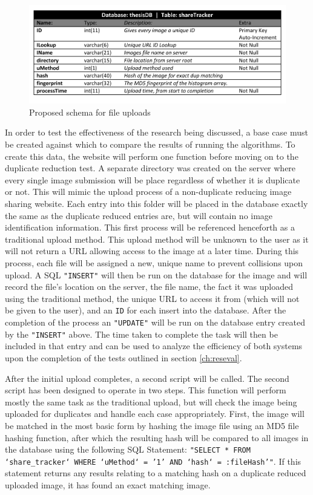\begin{figure}[htbp]
\centering
\includegraphics[width=6in]{schema}
\caption{Proposed schema for file uploads}
\label{fig:schema}
\end{figure}

In order to test the effectiveness of the research being discussed, a base case must be created against which to compare the results of running the algorithms. To create this data, the website will perform one function before moving on to the duplicate reduction test. A separate directory was created on the server where every single image submission will be place regardless of whether it is duplicate or not. This will mimic the upload process of a non-duplicate reducing image sharing website. Each entry into this folder will be placed in the database exactly the same as the duplicate reduced entries are, but will contain no image identification information. This first process will be referenced henceforth as a traditional upload method. This upload method will be unknown to the user as it will not return a URL allowing access to the image at a later time. During this process, each file will be assigned a new, unique name to prevent collisions upon upload. A SQL {\tt "INSERT"} will then be run on the database for the image and will record the file's location on the server, the file name, the fact it was uploaded using the traditional method, the unique URL to access it from (which will not be given to the user), and an {\tt ID} for each insert into the database. After the completion of the process an {\tt "UPDATE"} will be run on the database entry created by the {\tt "INSERT"} above. The time taken to complete the task will then be included in that entry and can be used to analyze the efficiency of both systems upon the completion of the tests outlined in section \ref{ch:reseval}.

After the initial upload completes, a second script will be called. The second script has been designed to operate in two steps. This function will perform mostly the same task as the traditional upload, but will check the image being uploaded for duplicates and handle each case appropriately. First, the image will be matched in the most basic form by hashing the image file using an MD5 file hashing function, after which the resulting hash will be compared to all images in the database using the following SQL Statement: {\tt "SELECT * FROM `share\_tracker` WHERE `uMethod` = '1' AND `hash` = :fileHash'"}. If this statement returns any results relating to a matching hash on a duplicate reduced uploaded image, it has found an exact matching image. 

